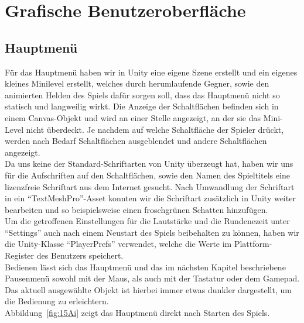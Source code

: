 \section{Grafische Benutzeroberfläche}

\subsection{Hauptmenü}
Für das Hauptmenü haben wir in Unity eine eigene Szene erstellt und ein eigenes kleines Minilevel erstellt, welches durch herumlaufende Gegner, sowie den animierten Helden des Spiels dafür sorgen soll, dass das Hauptmenü nicht so statisch und langweilig wirkt. Die Anzeige der Schaltflächen befinden sich in einem Canvas-Objekt und wird an einer Stelle angezeigt, an der sie das Mini-Level nicht überdeckt. Je nachdem auf welche Schaltfläche der Spieler drückt, werden nach Bedarf Schaltflächen ausgeblendet und andere Schaltflächen angezeigt.\\

Da uns keine der Standard-Schriftarten von Unity überzeugt hat, haben wir uns für die Aufschriften auf den Schaltflächen, sowie den Namen des Spieltitels eine lizenzfreie Schriftart aus dem Internet gesucht. Nach Umwandlung der Schriftart in ein \enquote{TextMeshPro}-Asset konnten wir die Schriftart zusätzlich in Unity weiter bearbeiten und so beispielsweise einen froschgrünen Schatten hinzufügen. \\

Um die getroffenen Einstellungen für die Lautstärke und die Rundenezeit unter \enquote{Settings} auch nach einem Neustart des Spiels beibehalten zu können, haben wir die Unity-Klasse \enquote{PlayerPrefs} verwendet, welche die Werte im Plattform-Register des Benutzers speichert.\\

Bedienen lässt sich das Hauptmenü und das im nächsten Kapitel beschriebene Pausenmenü sowohl mit der Maus, als auch mit der Tastatur oder dem Gamepad. Das aktuell ausgewählte Objekt ist hierbei immer etwas dunkler dargestellt, um die Bedienung zu erleichtern.\\

Abbildung~\ref{fig:15Ai} zeigt das Hauptmenü direkt nach Starten des Spiels.\\

